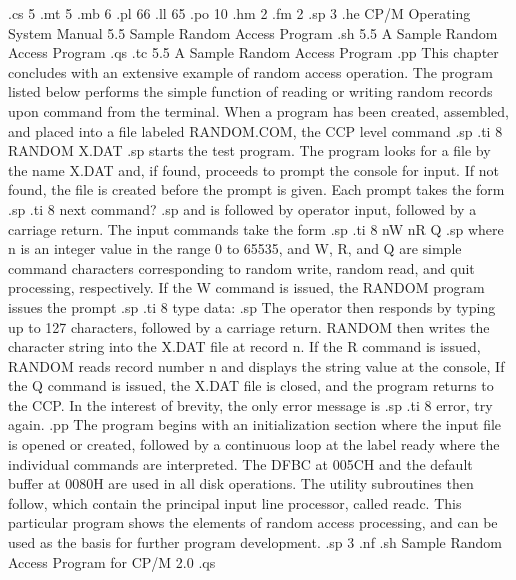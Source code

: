 .cs 5
.mt 5
.mb 6
.pl 66
.ll 65
.po 10
.hm 2
.fm 2
.sp 3
.he CP/M Operating System Manual   5.5   Sample Random Access Program
.sh
5.5  A Sample Random Access Program
.qs
.tc    5.5  A Sample Random Access Program
.pp
This chapter concludes with an extensive example of random access operation.  
The program listed below performs the simple function of reading or writing 
random records upon command from the terminal.  When a 
program has been created, assembled, and placed into a file 
labeled RANDOM.COM, the CCP level command
.sp
.ti 8
RANDOM X.DAT
.sp
starts the test program.  The program looks for a file by the 
name X.DAT and, if found, proceeds to prompt the console for 
input.  If not found, the file is created before the prompt is 
given.  Each prompt takes the form
.sp
.ti 8
next command?
.sp
and is followed by operator input, followed by a carriage 
return.  The input commands take the form 
.sp
.ti 8
nW  nR  Q
.sp
where n is an integer value in the range 0 to 65535, and W, R, 
and Q are simple command characters corresponding to random 
write, random read, and quit processing, respectively.  If the W 
command is issued, the RANDOM program issues the prompt
.sp
.ti 8
type data:
.sp
The operator then responds by typing up to 127 characters, 
followed by a carriage return.  RANDOM then writes the character 
string into the X.DAT file at record n.  If the R command is 
issued, RANDOM reads record number n and displays the string 
value at the console,  If the Q command is issued, the X.DAT file 
is closed, and the program returns to the CCP.  In the interest 
of brevity, the only error message is
.sp
.ti 8
error, try again.
.pp
The program begins with an initialization section where the input 
file is opened or created, followed by a continuous loop at the 
label ready where the individual commands are interpreted.  The 
DFBC at 005CH and the default buffer at 0080H are used in all 
disk operations.  The utility subroutines then follow, which 
contain the principal input line processor, called readc.  This 
particular program shows the elements of random access 
processing, and can be used as the basis for further program 
development.
.sp 3
.nf
.sh
                            Sample Random Access Program for CP/M 2.0 
.qs

